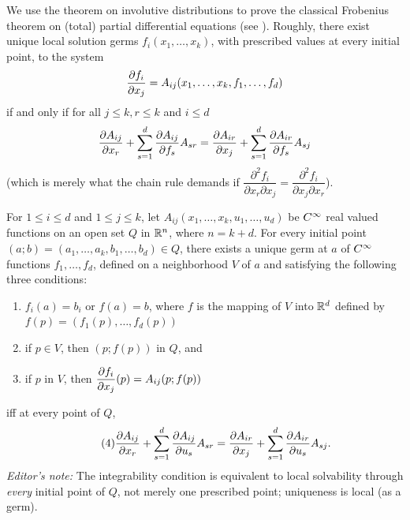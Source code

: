 \documentclass[../main]{subfiles}
\begin{document}
We use the theorem on involutive distributions to prove the classical Frobenius theorem on (total) partial differential equations (see \cite{levi1977absolute}). Roughly, there exist unique local solution germs $f_i(x_1,\ldots,x_k)$, with prescribed values at every initial point, to the system
\[
\dfrac{\partial f_i}{\partial x_j}=A_{i j}(x_{1}, \ldots, x_{k}, f_{1}, \ldots, f_{d})
\]
if and only if for all $j \leq k, r \leq k$ and $i \leq d$
\[
\dfrac{\partial A_{ij}}{\partial x_r}+\sum_{s=1}^{d} \dfrac{\partial A_{ij}}{\partial f_s}A_{s r}=\dfrac{\partial A_{ir}}{\partial x_j}+\sum_{s=1}^{d} \dfrac{\partial A_{ir}}{\partial f_s} A_{s j}
\]
(which is merely what the chain rule demands if $\dfrac{\partial^{2} f_{i}}{\partial x_{r} \partial x_{j}}=\dfrac{\partial^{2} f_{i}}{\partial x_{j} \partial x_{r}}$).

\begin{theorem}[Frobenius]\label{thm:ch09.1.3}
For $1 \leq i \leq d$ and $1 \leq j \leq k$, let $A_{ij}(x_1,\ldots,x_k,u_1,\ldots,u_d)$ be $C^\infty$ real valued functions on an open set $Q$ in $\mathbb{R}^n$, where $n=k+d$. For every initial point $(a;b)=(a_1,\ldots,a_k,b_1,\ldots,b_d)\in Q$, there exists a unique germ at $a$ of $C^\infty$ functions $f_1,\ldots,f_d$, defined on a neighborhood $V$ of $a$ and satisfying the following three conditions:
\begin{enumerate}[label=(\arabic*)]
    \item $f_{i}(a)=b_{i}$ or $f(a)=b$, where $f$ is the mapping of $V$ into $\mathbb{R}^{d}$ defined by $f(p)=(f_{1}(p), \ldots, f_{d}(p))$ \label{enu:9.1.1}
    \item if $p\in V$, then $(p; f(p))$ in $Q$, and \label{enu:9.1.2}
    \item if $p$ in $V$, then $\dfrac{\partial f_i}{\partial x_j}(p)=A_{i j}(p ; f(p))$ \label{enu:9.1.3}
\end{enumerate}
iff at every point of $Q$,
\[\tag{4}\label{enu:9.1.4} \dfrac{\partial A_{ij}}{\partial x_r}+\sum_{s=1}^d \dfrac{\partial A_{ij}}{\partial u_s} A_{sr} = \dfrac{\partial A_{ir}}{\partial x_j} +\sum_{s=1}^d \dfrac{\partial A_{ir}}{\partial u_s} A_{sj}.\]
\emph{Editor's note:} The integrability condition is equivalent to local solvability through \emph{every} initial point of $Q$, not merely one prescribed point; uniqueness is local (as a germ).
\end{theorem} 
\end{document}
